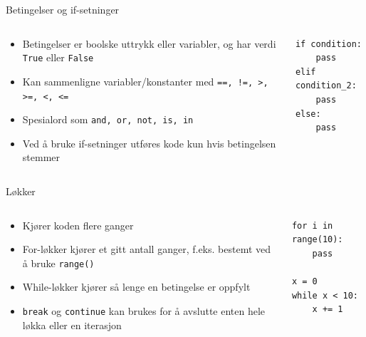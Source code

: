\documentclass[screen, aspectratio=169]{beamer}
\begin{document}
\begin{frame}[fragile]{Betingelser og if-setninger}
	\begin{columns}
		\begin{column}{.6\textwidth}
			\begin{itemize}
				\item Betingelser er boolske uttrykk eller variabler, og har verdi \lstinline|True| eller \lstinline|False|
				\item Kan sammenligne variabler/konstanter med \lstinline|==, !=, >, >=, <, <=|
				\item Spesialord som \lstinline|and, or, not, is, in|
				\item Ved å bruke if-setninger utføres kode kun hvis betingelsen stemmer
			\end{itemize}
		\end{column}
		\begin{column}{.4\textwidth}
			\begin{lstlisting}
if condition:
	pass
elif condition_2:
	pass
else:
	pass
			\end{lstlisting}
		\end{column}
	\end{columns}
\end{frame}

\begin{frame}[fragile]{Løkker}
	\begin{columns}
		\begin{column}{.6\textwidth}
			\begin{itemize}
				\item Kjører koden flere ganger
				\item For-løkker kjører et gitt antall ganger, f.eks. bestemt ved å bruke \lstinline|range()|
				\item While-løkker kjører så lenge en betingelse er oppfylt
				\item \lstinline|break| og \lstinline|continue| kan brukes for å avslutte enten hele løkka eller en iterasjon
			\end{itemize}
		\end{column}
		\begin{column}{.4\textwidth}
			\begin{lstlisting}
for i in range(10):
	pass

x = 0
while x < 10:
	x += 1
			\end{lstlisting}
		\end{column}
	\end{columns}
\end{frame}
\end{document}
